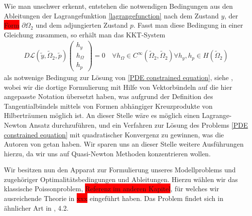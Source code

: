 Wie man unschwer erkennt, entstehen die notwendigen Bedingungen aus den Ableitungen der Lagrangefunktion \ref{lagrangefunction} nach dem Zustand $y$, der \colorbox{red}{Form} $\partial\Omega_2$ und dem adjungierten Zustand $p$. Fasst man diese Bedingung in einer Gleichung zusammen, so erhält man das KKT-System
\begin{align*}
	D\mathcal{L}(\tilde{y},\tilde{\Omega}_2,\tilde{p})\left(
	\begin{matrix}
	h_y \\
	h_{\Omega} \\
	h_p
	\end{matrix}\right)	 = 0 \quad \forall h_{\Omega} \in C^{\infty}(\tilde{\Omega}_2,\tilde{\Omega}_2)
	\forall h_y, h_p \in H(\tilde{\Omega}_2)
\end{align*}
als notwenige Bedingung zur Lösung von \ref{PDE constrained equation}, siehe \cite{LagrangeNewton}, wobei wir die dortige Formulierung mit Hilfe von Vektorbündeln auf die hier angepasste Notation übersetzt haben, was aufgrund der Definition des Tangentialbündels mittels von Formen abhängiger Kreuzprodukte von Hilberträumen  möglich ist. An dieser Stelle wäre es möglich einen Lagrange-Newton Ansatz durchzuführen, und ein Verfahren zur Lösung des Problems \ref{PDE constrained equation} mit quadratischer Konvergenz zu gewinnen, was die Autoren von \cite{LagrangeNewton} getan haben. Wir sparen uns an dieser Stelle weitere Ausführungen hierzu, da wir uns auf Quasi-Newton Methoden konzentrieren wollen.

Wir besitzen nun den Apparat zur Formulierung unseres Modellproblems und zugehöriger Optimalitätsbedingungen und Ableitungen. Hierzu wählen wir das klassische Poissonproblem, \colorbox{red}{Referenz im anderen Kapitel}, für welches wir ausreichende Theorie in \colorbox{red}{xxx} eingeführt haben. Das Problem findet sich in ähnlicher Art in \cite{shape_space}, 4.2.

